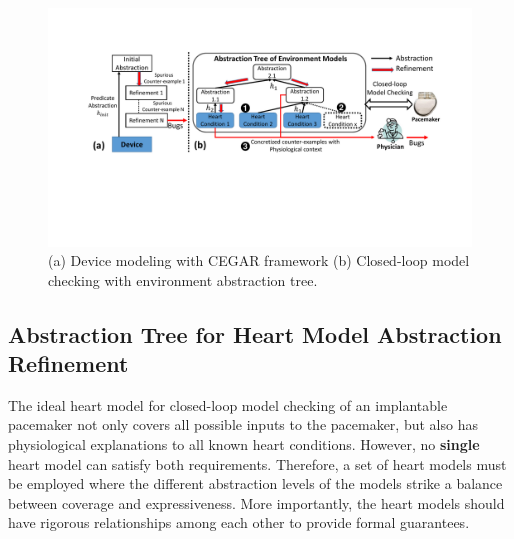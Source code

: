 \begin{figure}[!t]
		\centering
		\includegraphics[width=\textwidth]{figs/distinction.pdf}
		\caption{\small (a) Device modeling with CEGAR framework (b) Closed-loop model checking with environment abstraction tree.}%
		  \vspace{-10pt}
		\label{fig:distinction}
\end{figure}

\subsection{Abstraction Tree for Heart Model Abstraction Refinement}
The ideal heart model for closed-loop model checking of an implantable pacemaker not only covers all possible inputs to the pacemaker, but also has physiological explanations to all known heart conditions.
However, no \textbf{single} heart model can satisfy both requirements.
Therefore, a set of heart models must be employed where the different abstraction levels of the models strike a balance between coverage and expressiveness.
More importantly, the heart models should have rigorous relationships among each other to provide formal guarantees.

